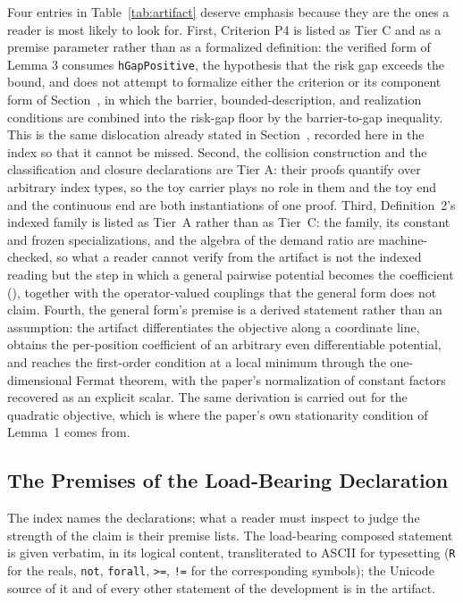 Four entries in Table~\ref{tab:artifact} deserve emphasis because they are the ones a reader is most likely to look for. First, Criterion P4 is listed as Tier C and as a premise parameter rather than as a formalized definition: the verified form of Lemma 3 consumes \texttt{hGapPositive}, the hypothesis that the risk gap exceeds the bound, and does not attempt to formalize either the criterion or its component form of Section~\pSecPfour, in which the barrier, bounded-description, and realization conditions are combined into the risk-gap floor by the barrier-to-gap inequality. This is the same dislocation already stated in Section~\pSecVerify, recorded here in the index so that it cannot be missed. Second, the collision construction and the classification and closure declarations are Tier A: their proofs quantify over arbitrary index types, so the toy carrier plays no role in them and the toy end and the continuous end are both instantiations of one proof. Third, Definition~2's indexed family is listed as Tier~A rather than as Tier~C: the family, its constant and frozen specializations, and the algebra of the demand ratio are machine-checked, so what a reader cannot verify from the artifact is not the indexed reading but the step in which a general pairwise potential becomes the coefficient (\pEqFoc), together with the operator-valued couplings that the general form does not claim.
Fourth, the general form's premise is a derived statement rather than an assumption: the artifact differentiates the objective along a coordinate line, obtains the per-position coefficient of an arbitrary even differentiable potential, and reaches the first-order condition at a local minimum through the one-dimensional Fermat theorem, with the paper's normalization of constant factors recovered as an explicit scalar. The same derivation is carried out for the quadratic objective, which is where the paper's own stationarity condition of Lemma~1 comes from. 
\subsection{The Premises of the Load-Bearing Declaration}

The index names the declarations; what a reader must inspect to judge the strength of the claim is their premise lists.
The load-bearing composed statement is given verbatim, in its logical content, transliterated to ASCII for typesetting
(\texttt{R} for the reals, \texttt{not}, \texttt{forall}, \texttt{>=}, \texttt{!=} for the corresponding symbols); the
Unicode source of it and of every other statement of the development is in the artifact.

